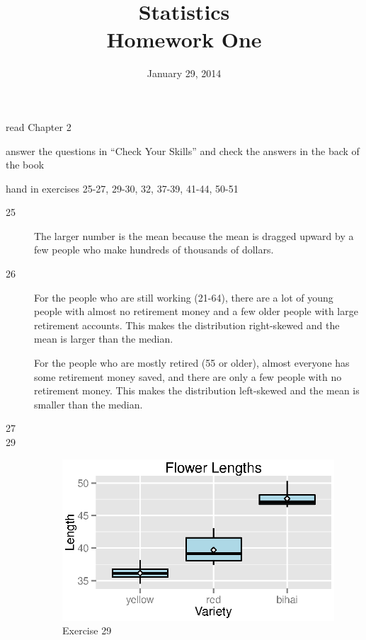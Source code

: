 \documentclass{exam}
\author{}
\date{January 29, 2014}
\title{Statistics \\ Homework One}
\begin{document}
  \maketitle

  \ifprintanswers
  \else
    \begin{itemize*}
      \item read Chapter 2 
      \item answer the questions in ``Check Your Skills'' and check the answers in the back of the book
      \item hand in exercises 25-27, 29-30, 32, 37-39, 41-44, 50-51
    \end{itemize*}
  \fi

  \ifprintanswers
    \begin{description}
      \item[25] The larger number is the mean because the mean is dragged upward by a few people who make hundreds of
        thousands of dollars.

      \item[26] For the people who are still working (21-64), there are a lot of young people with almost no retirement
        money and a few older people with large retirement accounts.  This makes the distribution right-skewed and the
        mean is larger than the median.

        For the people who are mostly retired (55 or older), almost everyone has some retirement money saved, and there
        are only a few people with no retirement money.  This makes the distribution left-skewed and the mean is smaller
        than the median.

      \item[27] 

      \item[29]
        \begin{figure}[H]
          \centering
          \includegraphics{figures/ex29.eps}
          \caption{Exercise 29}
        \end{figure}


\end{description}
\end{document}
